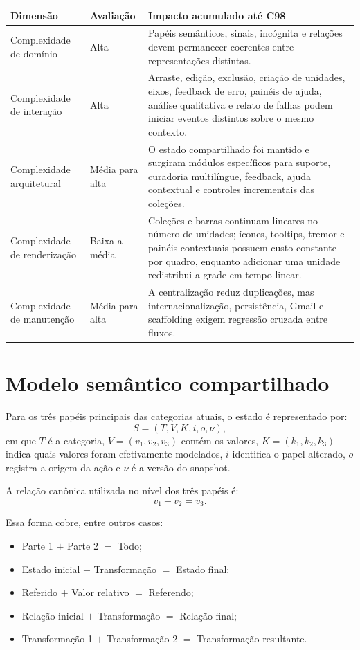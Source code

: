 \documentclass[12pt,a4paper]{article}
\begin{document}
\begin{tabularx}{\textwidth}{p{3.8cm}p{2.8cm}X}
\toprule
\textbf{Dimensão} & \textbf{Avaliação} & \textbf{Impacto acumulado até C98}\\
\midrule
Complexidade de domínio & Alta & Papéis semânticos, sinais, incógnita e relações devem permanecer coerentes entre representações distintas.\\
Complexidade de interação & Alta & Arraste, edição, exclusão, criação de unidades, eixos, feedback de erro, painéis de ajuda, análise qualitativa e relato de falhas podem iniciar eventos distintos sobre o mesmo contexto.\\
Complexidade arquitetural & Média para alta & O estado compartilhado foi mantido e surgiram módulos específicos para suporte, curadoria multilíngue, feedback, ajuda contextual e controles incrementais das coleções.\\
Complexidade de renderização & Baixa a média & Coleções e barras continuam lineares no número de unidades; ícones, tooltips, tremor e painéis contextuais possuem custo constante por quadro, enquanto adicionar uma unidade redistribui a grade em tempo linear.\\
Complexidade de manutenção & Média para alta & A centralização reduz duplicações, mas internacionalização, persistência, Gmail e scaffolding exigem regressão cruzada entre fluxos.\\
\bottomrule
\end{tabularx}

\section{Modelo semântico compartilhado}

Para os três papéis principais das categorias atuais, o estado é representado por:
\[
S = (T, V, K, i, o, \nu),
\]
em que $T$ é a categoria, $V=(v_1,v_2,v_3)$ contém os valores, $K=(k_1,k_2,k_3)$ indica quais valores foram efetivamente modelados, $i$ identifica o papel alterado, $o$ registra a origem da ação e $\nu$ é a versão do snapshot.

A relação canônica utilizada no nível dos três papéis é:
\[
v_1 + v_2 = v_3.
\]

Essa forma cobre, entre outros casos:
\begin{itemize}[noitemsep]
  \item Parte 1 $+$ Parte 2 $=$ Todo;
  \item Estado inicial $+$ Transformação $=$ Estado final;
  \item Referido $+$ Valor relativo $=$ Referendo;
  \item Relação inicial $+$ Transformação $=$ Relação final;
  \item Transformação 1 $+$ Transformação 2 $=$ Transformação resultante.
\end{itemize}
\end{document}
